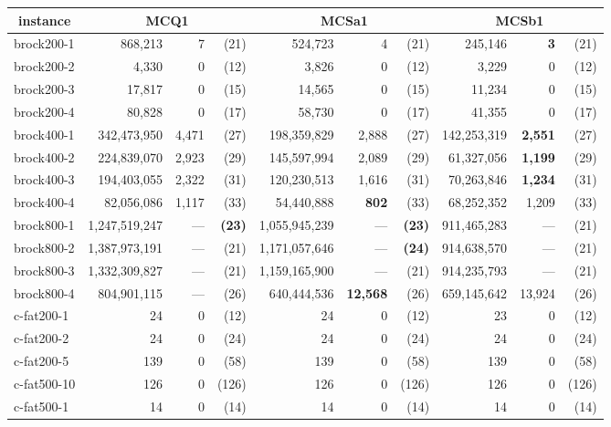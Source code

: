 \documentclass{l4proj}
\begin{document}
%
\begin{table}
\begin{center}
\begin{scriptsize}
\begin{tabular}{|l|r r r|r r r|r r r|} \hline 
\multicolumn{1}{|c|}{instance} & \multicolumn{3}{|c|}{MCQ1} & \multicolumn{3}{|c|}{MCSa1} & \multicolumn{3}{|c|}{MCSb1} \\ \hline
brock200-1 & 868,213 & 7 & (21) & 524,723 & 4 & (21) & 245,146 & \bf{3} & (21) \\ 
brock200-2 & 4,330 & 0 & (12) & 3,826 & 0 & (12) & 3,229 & 0 & (12) \\ 
brock200-3 & 17,817 & 0 & (15) & 14,565 & 0 & (15) & 11,234 & 0 & (15) \\ 
brock200-4 & 80,828 & 0 & (17) & 58,730 & 0 & (17) & 41,355 & 0 & (17) \\ 
brock400-1 & 342,473,950 & 4,471 & (27) & 198,359,829 & 2,888 & (27) & 142,253,319 & \bf{2,551} & (27) \\ 
brock400-2 & 224,839,070 & 2,923 & (29) & 145,597,994 & 2,089 & (29) & 61,327,056 & \bf{1,199} & (29) \\ 
brock400-3 & 194,403,055 & 2,322 & (31) & 120,230,513 & 1,616 & (31) & 70,263,846 & \bf{1,234} & (31) \\ 
brock400-4 & 82,056,086 & 1,117 & (33) & 54,440,888 & \bf{802} & (33) & 68,252,352 & 1,209 & (33) \\ 
brock800-1 & 1,247,519,247 & --- & \bf{(23)} & 1,055,945,239 & --- & \bf{(23)} & 911,465,283 & --- & (21) \\ 
brock800-2 & 1,387,973,191 & --- & (21) & 1,171,057,646 & --- & \bf{(24)} & 914,638,570 & --- & (21) \\ 
brock800-3 & 1,332,309,827 & --- & (21) & 1,159,165,900 & --- & (21) & 914,235,793 & --- & (21) \\ 
brock800-4 & 804,901,115 & --- & (26) & 640,444,536 & \bf{12,568} & (26) & 659,145,642 & 13,924 & (26) \\ 
c-fat200-1 & 24 & 0 & (12) & 24 & 0 & (12) & 23 & 0 & (12) \\ 
c-fat200-2 & 24 & 0 & (24) & 24 & 0 & (24) & 24 & 0 & (24) \\ 
c-fat200-5 & 139 & 0 & (58) & 139 & 0 & (58) & 139 & 0 & (58) \\ 
c-fat500-10 & 126 & 0 & (126) & 126 & 0 & (126) & 126 & 0 & (126) \\ 
c-fat500-1 & 14 & 0 & (14) & 14 & 0 & (14) & 14 & 0 & (14) \\ 

\end{tabular}
\end{scriptsize}
\end{center}
\end{table}
\end{document}

